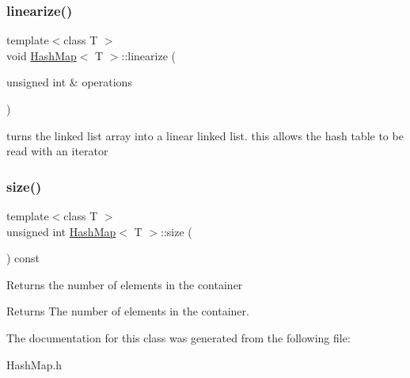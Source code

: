 \subsubsection{\texorpdfstring{linearize()}{linearize()}}
{\footnotesize\ttfamily template$<$class T $>$ \\
void \hyperlink{class_hash_map}{Hash\+Map}$<$ T $>$\+::linearize (\begin{DoxyParamCaption}\item[{unsigned int \&}]{operations }\end{DoxyParamCaption})}

turns the linked list array into a linear linked list. this allows the hash table to be read with an iterator \mbox{\label{class_hash_map_a1966ffac76bb402b771945c11b8b719a}} 
\subsubsection{\texorpdfstring{size()}{size()}}
{\footnotesize\ttfamily template$<$class T $>$ \\
unsigned int \hyperlink{class_hash_map}{Hash\+Map}$<$ T $>$\+::size (\begin{DoxyParamCaption}{ }\end{DoxyParamCaption}) const}

Returns the number of elements in the container \begin{DoxyReturn}{Returns}
The number of elements in the container. 
\end{DoxyReturn}


The documentation for this class was generated from the following file\+:\begin{DoxyCompactItemize}
\item 
Hash\+Map.\+h\end{DoxyCompactItemize}
